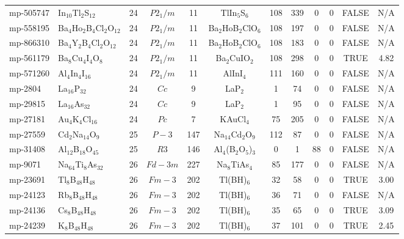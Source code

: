 {\begin{longtable}{llcccccccccc}
    mp-505747 & In$_{10}$Tl$_{2}$S$_{12}$ & 24    & $P2_1/m$ & 11    & TlIn$_{5}$S$_{6}$ & 108   & 339   & 0     & 0     & FALSE & N/A \\
    mp-558195 & Ba$_{4}$Ho$_{2}$B$_{4}$Cl$_{2}$O$_{12}$ & 24    & $P2_1/m$ & 11    & Ba$_{2}$HoB$_{2}$ClO$_{6}$ & 108   & 197   & 0     & 0     & FALSE & N/A \\
    mp-866310 & Ba$_{4}$Y$_{2}$B$_{4}$Cl$_{2}$O$_{12}$ & 24    & $P2_1/m$ & 11    & Ba$_{2}$HoB$_{2}$ClO$_{6}$ & 108   & 183   & 0     & 0     & FALSE & N/A \\
    mp-561179 & Ba$_{8}$Cu$_{4}$I$_{4}$O$_{8}$ & 24    & $P2_1/m$ & 11    & Ba$_{2}$CuIO$_{2}$ & 108   & 298   & 0     & 0     & TRUE  & 4.82  \\
    mp-571260 & Al$_{4}$In$_{4}$I$_{16}$ & 24    & $P2_1/m$ & 11    & AlInI$_{4}$ & 111   & 160   & 0     & 0     & FALSE & N/A \\
    mp-2804 & La$_{16}$P$_{32}$ & 24    & $Cc$  & 9     & LaP$_{2}$ & 1     & 74    & 0     & 0     & FALSE & N/A \\
    mp-29815 & La$_{16}$As$_{32}$ & 24    & $Cc$  & 9     & LaP$_{2}$ & 1     & 95    & 0     & 0     & FALSE & N/A \\
    mp-27181 & Au$_{4}$K$_{4}$Cl$_{16}$ & 24    & $Pc$  & 7     & KAuCl$_{4}$ & 75    & 205   & 0     & 0     & FALSE & N/A \\
    mp-27559 & Cd$_{2}$Na$_{14}$O$_{9}$ & 25    & $P-3$ & 147   & Na$_{14}$Cd$_{2}$O$_{9}$ & 112   & 87    & 0     & 0     & FALSE & N/A \\
    mp-31408 & Al$_{12}$B$_{18}$O$_{45}$ & 25    & $R3$  & 146   & Al$_{4}$(B$_{2}$O$_{5}$)$_{3}$ & 0     & 1     & 88    & 0     & FALSE & N/A \\
    mp-9071 & Na$_{64}$Ti$_{8}$As$_{32}$ & 26    & $Fd-3m$ & 227   & Na$_{8}$TiAs$_{4}$ & 85    & 177   & 0     & 0     & FALSE & N/A \\
    mp-23691 & Tl$_{8}$B$_{48}$H$_{48}$ & 26    & $Fm-3$ & 202   & Tl(BH)$_{6}$ & 32    & 58    & 0     & 0     & TRUE  & 3.00  \\
    mp-24123 & Rb$_{8}$B$_{48}$H$_{48}$ & 26    & $Fm-3$ & 202   & Tl(BH)$_{6}$ & 36    & 71    & 0     & 0     & FALSE & N/A \\
    mp-24136 & Cs$_{8}$B$_{48}$H$_{48}$ & 26    & $Fm-3$ & 202   & Tl(BH)$_{6}$ & 35    & 65    & 0     & 0     & TRUE  & 3.09  \\
    mp-24239 & K$_{8}$B$_{48}$H$_{48}$ & 26    & $Fm-3$ & 202   & Tl(BH)$_{6}$ & 37    & 101   & 0     & 0     & TRUE  & 2.45  \\

\end{longtable}}
